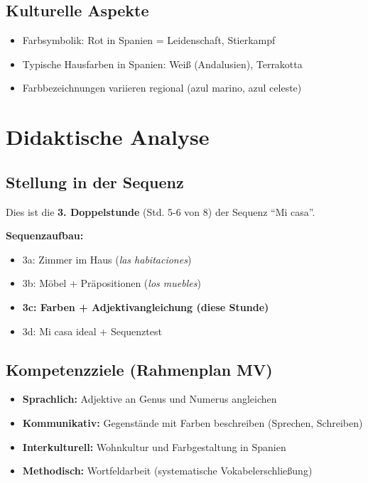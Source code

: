 \documentclass[11pt,a4paper]{article}
\newcommand{\reihenthema}{Mi casa}
\begin{document}
\subsection{Kulturelle Aspekte}
\begin{itemize}
    \item Farbsymbolik: Rot in Spanien = Leidenschaft, Stierkampf
    \item Typische Hausfarben in Spanien: Weiß (Andalusien), Terrakotta
    \item Farbbezeichnungen variieren regional (azul marino, azul celeste)
\end{itemize}

\section{Didaktische Analyse}

\subsection{Stellung in der Sequenz}
Dies ist die \textbf{3. Doppelstunde} (Std. 5-6 von 8) der Sequenz ``\reihenthema''.

\textbf{Sequenzaufbau:}
\begin{itemize}
    \item 3a: Zimmer im Haus (\textit{las habitaciones})
    \item 3b: Möbel + Präpositionen (\textit{los muebles})
    \item \textbf{3c: Farben + Adjektivangleichung (diese Stunde)}
    \item 3d: Mi casa ideal + Sequenztest
\end{itemize}

\subsection{Kompetenzziele (Rahmenplan MV)}
\begin{itemize}
    \item \textbf{Sprachlich:} Adjektive an Genus und Numerus angleichen
    \item \textbf{Kommunikativ:} Gegenstände mit Farben beschreiben (Sprechen, Schreiben)
    \item \textbf{Interkulturell:} Wohnkultur und Farbgestaltung in Spanien
    \item \textbf{Methodisch:} Wortfeldarbeit (systematische Vokabelerschließung)
\end{itemize}
\end{document}
